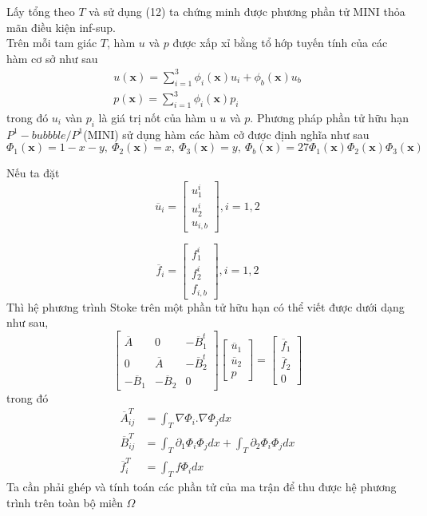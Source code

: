 \documentclass[14pt]{extreport}
\begin{document}
{Lấy tổng theo $T$ và sử dụng (12) ta chứng minh được phương phần tử MINI thỏa mãn điều kiện inf-sup. \\
Trên mỗi tam giác $T$, hàm $u$ và $p$ được xấp xỉ bằng tổ hớp tuyến tính của các hàm cơ sở như sau
\begin{equation} \label{eq17}
\begin{split}
u(\mathbf{x}) = \sum_{i=1}^3 \phi_i(\mathbf{x}) u_i + \phi_b(\mathbf{x}) u_b \\
p(\mathbf{x}) = \sum_{i=1}^3 \phi_i(\mathbf{x})p_i
\end{split}
\end{equation}
trong đó $u_i$ vàn $p_i$ là giá trị nốt của hàm u $u$ và $p$. Phương pháp phần tử hữu hạn $P^1-bubbble / P^1$(MINI) sử dụng hàm các hàm cở được định nghĩa như sau
$$\Phi_1(\mathbf{x}) = 1 - x-y, \ \Phi_2(\mathbf{x}) = x, \ \Phi_3(\mathbf{x}) = y, \ \Phi_b(\mathbf{x}) = 27 \Phi_1(\mathbf{x})\Phi_2(\mathbf{x})\Phi_3(\mathbf{x})$$

Nếu ta đặt
\[
\overline{u}_i
=
\begin{bmatrix}
    u_1^i \\
    u_2^i \\
    u_{i, b}
\end{bmatrix}
, i = 1,2
\]

\[
\overline{f}_i
=
\begin{bmatrix}
    f_1^i \\
    f_2^i \\
    f_{i, b}
\end{bmatrix}
, i = 1,2
\]
Thì hệ phương trình Stoke trên một phần tử hữu hạn có thể viết được dưới dạng như sau,
\begin{equation}
  \begin{bmatrix}
    \overline{A} & 0 & -\overline{B}_1^t \\
    0 & \overline{A} & -\overline{B}_2^t \\
    -\overline{B}_1 & -\overline{B}_2 & 0
  \end{bmatrix}
  \begin{bmatrix}
    \overline{u}_1 \\
    \overline{u}_2 \\
    p
  \end{bmatrix}
  =
  \begin{bmatrix}
    \overline{f}_1 \\
    \overline{f}_2 \\
    0
  \end{bmatrix}
  \label{eq18}
\end{equation}
trong đó
\begin{equation} \label{eq19}
\begin{split}
\overline{A}^T_{ij} & = \int_T \nabla \Phi_i . \nabla \Phi_j dx \\
\overline{B}^T_{ij} & = \int_T \partial_1 \Phi_i \Phi_j dx + \int_T \partial_2 \Phi_i \Phi_j dx \\
\overline{f}^T_i & = \int_T f \Phi_i dx
\end{split}
\end{equation}
Ta cần phải ghép và tính toán các phần tử của ma trận để thu được hệ phương trình trên toàn bộ miền $\Omega$
}
\end{document}
